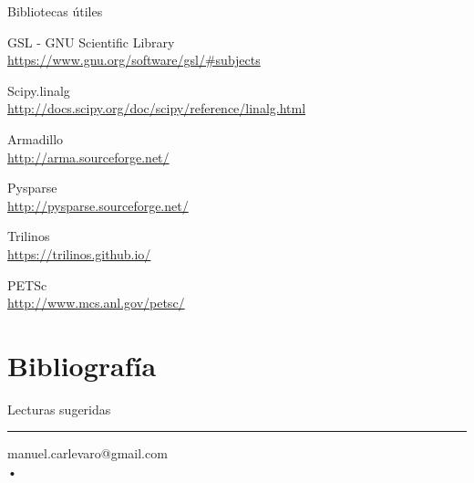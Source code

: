 \documentclass[9pt, aspectratio=169]{beamer}
\begin{document}
\begin{frame}{Bibliotecas útiles} 
\begin{center}
 \begin{itemize} {\Large
 \item GSL - GNU Scientific Library \\
  \url{https://www.gnu.org/software/gsl/#subjects}
  \item Scipy.linalg \\
  \url{http://docs.scipy.org/doc/scipy/reference/linalg.html} \medskip
  
  \item Armadillo \\
  \url{http://arma.sourceforge.net/} \medskip
  
  \item Pysparse \\
  \url{http://pysparse.sourceforge.net/} \medskip
  
  \item Trilinos \\
  \url{https://trilinos.github.io/} \medskip
  
  \item PETSc \\
  \url{http://www.mcs.anl.gov/petsc/} }
 \end{itemize} 
\end{center}
\end{frame}

\section{Bibliografía}
\begin{frame}{Lecturas sugeridas}
    \nocite{gonzalez2014, quarteroni2000, sanderson2016}
    \printbibliography

    \centering
    \noindent\rule{6cm}{0.4pt}

    \bigskip 
     {\small 
         \faEnvelope{} manuel.carlevaro@gmail.com  \\
     \faLinux \- •\- {\XeLaTeX} \\ 
     \ccbysa \\
 }
\end{frame}
\end{document}
